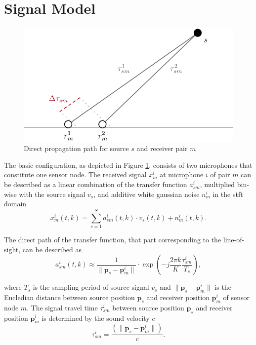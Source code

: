 \section{Signal Model}
\label{sec:signal}

\begin{figure}[!htp]
\centering
    \includegraphics[scale=0.7]{data/figures/signal2}
    \caption{Direct propagation path for source $s$ and receiver pair $m$}
    \label{fig:signal}
\end{figure}

The basic configuration, as depicted in Figure \ref{fig:signal}, consists of two microphones that constitute one sensor node. The received signal $x^i_m$ at microphone $i$ of pair $m$ can be described as a linear combination of the transfer function $a^i_{sm}$, multiplied bin-wise with the source signal $v_s$, and additive white gaussian noise $n^i_m$ in the \acrfull{stft} domain
\begin{equation}
	x_m^i(t,k)=\sum_{s=1}^{S}a_{sm}^i(t,k)\cdot v_s(t,k)+n_m^i(t,k).
	\label{eq:received_signal}
\end{equation}

The direct path of the transfer function, that part corresponding to the line-of-sight, can be described as
\begin{equation}
	a_{sm}^i(t,k)\approx\frac{1}{\|\bm p_s-\bm p_m^i\|}\cdot\exp{\left(-j\frac{2\pi k}{K}\frac{\tau^i_{sm}}{T_s}\right)},
	\label{eq:acoustic_transfer_function}
\end{equation}


where $T_s$ is the sampling period of source signal $v_s$ and $\|\bm p_s-\bm p_m^i\|$ is the Eucledian distance between source position $\bm p_s$ and receiver position $\bm p^i_m$ of sensor node $m$. The signal travel time $\tau^i_{sm}$ between source position $\bm p_s$ and receiver position $\bm p^i_m$ is determined by the sound velocity $c$
\begin{equation}
	\tau^i_{sm}=\frac{\left(\|\bm p_s-\bm p_m^i\|\right)}{c}.
\end{equation}

